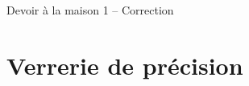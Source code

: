 
\usepackage{setspace}
\usepackage{enumitem}



\begin{header}
Devoir à la maison 1 -- Correction
\normalsize
\flushleft
%
%
\end{header}


\noindent

\section{Verrerie de précision}

